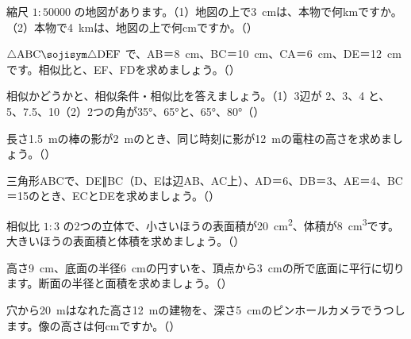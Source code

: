 \bkendproblems
{}

\bkproblem 縮尺 $1:\num{50000}$ の地図があります。（1）\nobreak 地図の上で\qty{3}{cm}は、本物で何kmですか。（2）\nobreak 本物で\qty{4}{km}は、地図の上で何cmですか。（）

\bkproblem $\triangle\mathrm{ABC}\sojisym\triangle\mathrm{DEF}$ で、AB＝\qty{8}{cm}、BC＝\qty{10}{cm}、CA＝\qty{6}{cm}、DE＝\qty{12}{cm}です。相似比と、EF、FDを求めましょう。（）

\bkproblem 相似かどうかと、相似条件・相似比を答えましょう。（1）\nobreak 3辺が 2、3、4 と、5、7.5、10\quad（2）\nobreak 2つの角が35°、65°と、65°、80°（）

\bkproblem 長さ\qty{1.5}{m}の棒の影が\qty{2}{m}のとき、同じ時刻に影が\qty{12}{m}の電柱の高さを求めましょう。（）

\bkproblem 三角形ABCで、DE∥BC（D、Eは辺AB、AC上）、AD＝6、DB＝3、AE＝4、BC＝15のとき、ECとDEを求めましょう。（）

\bkproblem 相似比 $1:3$ の2つの立体で、小さいほうの表面積が\qty{20}{cm^2}、体積が\qty{8}{cm^3}です。大きいほうの表面積と体積を求めましょう。（）

\bkproblem 高さ\qty{9}{cm}、底面の半径\qty{6}{cm}の円すいを、頂点から\qty{3}{cm}の所で底面に平行に切ります。断面の半径と面積を求めましょう。（）


\bkproblem 穴から\qty{20}{m}はなれた高さ\qty{12}{m}の建物を、深さ\qty{5}{cm}のピンホールカメラでうつします。像の高さは何cmですか。（）

